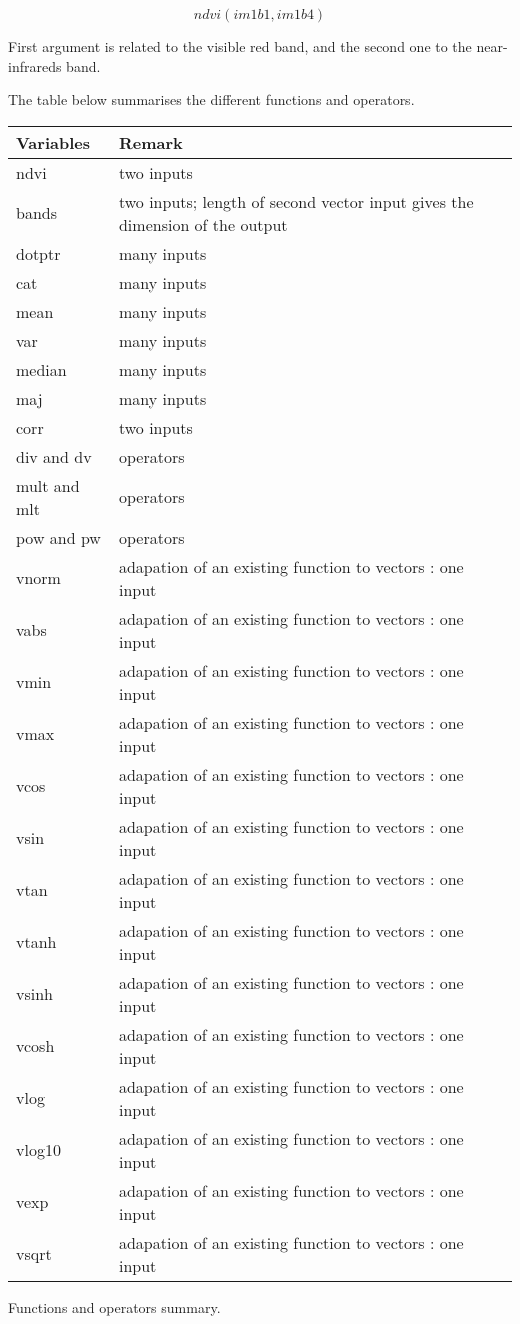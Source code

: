 \begin{equation}
	ndvi(im1b1,im1b4)
\end{equation}

First argument is related to the visible red band, and the second one to the near-infrareds band.

The table below summarises the different functions and operators.


\begin{center} 
\begin{tabular}{||l|l||}
\hline
\bf Variables & \bf Remark \\
\hline\hline
ndvi &  two inputs\\
bands & two inputs; length of second vector input gives the dimension of the output \\
dotptr &  many inputs \\
cat & many inputs \\
mean & many inputs \\
var & many inputs \\
median & many inputs \\
maj & many inputs \\
corr & two inputs \\
div and dv &  operators \\
mult and mlt & operators \\
pow and pw  & operators \\
vnorm  & adapation of an existing function to vectors : one input \\
vabs   & adapation of an existing function to vectors : one input \\
vmin   & adapation of an existing function to vectors : one input \\
vmax   & adapation of an existing function to vectors : one input \\
vcos   & adapation of an existing function to vectors : one input \\
vsin   & adapation of an existing function to vectors : one input \\
vtan   & adapation of an existing function to vectors : one input \\
vtanh  & adapation of an existing function to vectors : one input \\
vsinh  & adapation of an existing function to vectors : one input \\
vcosh  & adapation of an existing function to vectors : one input \\
vlog   & adapation of an existing function to vectors : one input \\
vlog10 & adapation of an existing function to vectors : one input \\
vexp   & adapation of an existing function to vectors : one input \\
vsqrt  & adapation of an existing function to vectors : one input \\
\hline
\end{tabular}
\end{center}
\caption{Functions and operators summary.}
\label{variables}


